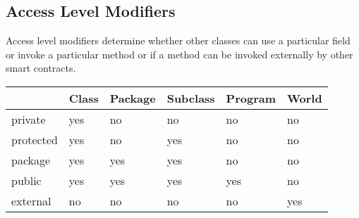 \subsection{Access Level Modifiers}\label{subsec:access-level-modifiers}

Access level modifiers determine whether other classes can use a particular field or invoke a particular method or
if a method can be invoked externally by other smart contracts.

\begin{center}
    \begin{tabular}{llllll}
        \hline
        & Class & Package & Subclass & Program & World \\
        \hline
        private   & yes   & no      & no       & no      & no    \\
        protected & yes   & no      & yes      & no      & no    \\
        package   & yes   & yes     & yes      & no      & no    \\
        public    & yes   & yes     & yes      & yes     & no    \\
        external  & no    & no      & no       & no      & yes   \\
        \hline
    \end{tabular}\label{tab:table}
\end{center}



